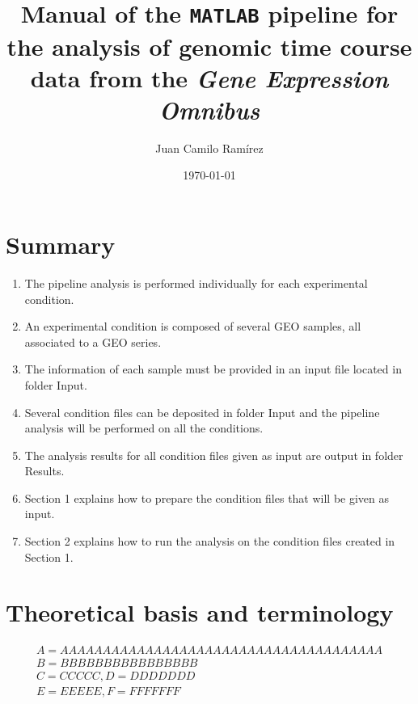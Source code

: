 \documentclass[final,letterpaper,twoside,12pt]{article}
\title{Manual of the \texttt{MATLAB} pipeline for the analysis of genomic time course data from the \textit{Gene Expression Omnibus}}
\author{Juan Camilo Ram\'{i}rez}
\date{\today}
\begin{document}
\maketitle

\tableofcontents

\listoffigures

\listoftables

\section{Summary}

\begin{enumerate}

\item The pipeline analysis is performed individually for each experimental condition.

\item An experimental condition is composed of several GEO samples, all associated to a GEO series.

\item The information of each sample must be provided in an input file located in folder Input.

\item Several condition files can be deposited in folder Input and the pipeline analysis will be performed on all the conditions.

\item The analysis results for all condition files given as input are output in folder Results.

\item Section 1 explains how to prepare the condition files that will be given as input.

\item Section 2 explains how to run the analysis on the condition files created in Section 1. 

\end{enumerate}




\section{Theoretical basis and terminology}
\label{section:theory_and_terminology}

\begin{equation} \label{eq:test}
\begin{gathered}
A=AAAAAAAAAAAAAAAAAAAAAAAAAAAAAAAAAAAAAA\\
B=BBBBBBBBBBBBBBBB\\
C=CCCCC, D=DDDDDDD\\
E=EEEEE, F=FFFFFFF
\end{gathered}
\end{equation}
\end{document}
